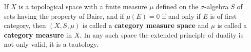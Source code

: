 If $X$ is a topological space with a finite measure $\mu$ defined on the $\sigma$-algebra $S$ of sets having the property of Baire, and if $\mu(E) = 0$ if and only if $E$ is of first category, then $(X, S, \mu)$ is called a \textbf{category measure space} and $\mu$ is called a \textbf{category measure} in $X$. In any such space the extended principle of duality is not only valid, it is a tautology.
